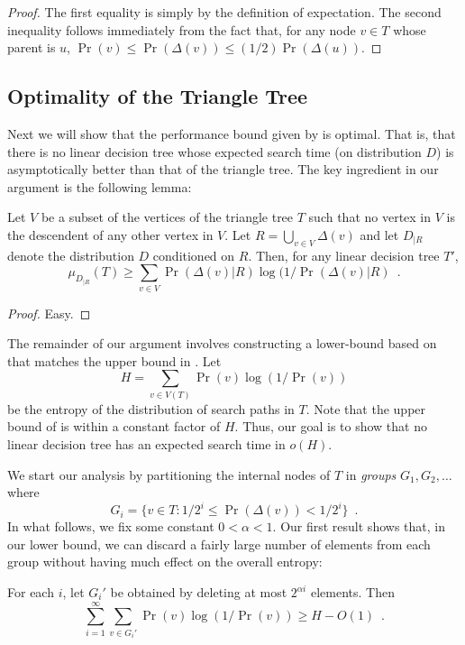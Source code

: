 \documentclass[charterfonts,lotsofwhite]{patmorin}
\begin{document}
\begin{proof}
The first equality is simply by the definition of expectation.  The
second inequality follows immediately from the fact that, for any node
$v\in T$ whose parent is $u$, $\Pr(v)\le \Pr(\Delta(v))\le (1/2)\Pr(\Delta(u))$.
\end{proof}


\subsection{Optimality of the Triangle Tree}

Next we will show that the performance bound given by
 is optimal.  That is, that there is no linear
decision tree whose expected search time (on distribution $D$) is
asymptotically better than that of the triangle tree.
The key ingredient in our argument is the following lemma:

\begin{lem}
Let $V$ be a subset of the vertices of the triangle tree $T$ such that
no vertex in $V$ is the descendent of any other vertex in $V$.  Let
$R=\bigcup_{v\in V} \Delta(v)$ and let $D_{|R}$ denote the
distribution $D$ conditioned on $R$.  Then, for any linear decision
tree $T'$,
\[
    \mu_{D_{|R}}(T) 
	\ge \sum_{v\in V}\Pr(\Delta(v)|R)\log(1/\Pr(\Delta(v)|R) \enspace .
\]
\end{lem}

\begin{proof}
Easy.
\end{proof}

The remainder of our argument involves constructing a lower-bound
based on  that matches the upper bound in
.  Let 
\[
   H = \sum_{v\in V(T)} \Pr(v)\log (1/\Pr(v))
\] 
be the entropy of the distribution of search paths in $T$.  Note that
the upper bound of  is within a constant factor of
$H$. Thus, our goal is to show that no linear decision tree has an
expected search time in $o(H)$.

We start our analysis by partitioning the internal nodes of $T$ in
\emph{groups} $G_1,G_2,\ldots$ where
\[
	G_i = \{v\in T : 1/2^{i} \le \Pr(\Delta(v)) < 1/2^i \} \enspace .
\]
In what follows, we fix some constant $0< \alpha < 1$.  Our first
result shows that, in our lower bound, we can discard a fairly large
number of elements from each group without having much effect on the
overall entropy:

\begin{lem}
For each $i$, let $G_i'$ be obtained by deleting at most $2^{\alpha
i}$ elements.  Then
\[
    \sum_{i=1}^\infty \sum_{v\in G_i'} \Pr(v)\log(1/\Pr(v)) \ge H-O(1)
	\enspace .
\]
\end{lem}
\end{document}
